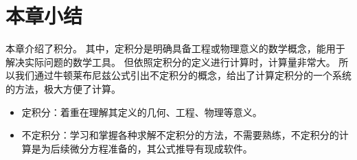 \section{本章小结}

本章介绍了积分。
其中，定积分是明确具备工程或物理意义的数学概念，能用于解决实际问题的数学工具。
但依照定积分的定义进行计算时，计算量非常大。
所以我们通过牛顿莱布尼兹公式引出不定积分的概念，给出了计算定积分的一个系统的方法，极大方便了计算。

\begin{itemize}
    \item 定积分：着重在理解其定义的几何、工程、物理等意义。
    \item 不定积分：学习和掌握各种求解不定积分的方法，不需要熟练，不定积分的计算是为后续微分方程准备的，其公式推导有现成软件。
\end{itemize}




